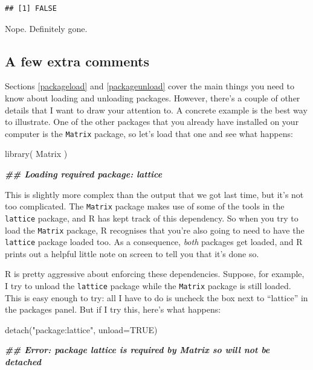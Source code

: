 \documentclass[
]{book}
\newenvironment{Shaded}{\begin{snugshade}}{\end{snugshade}}
\newcommand{\AttributeTok}[1]{\textcolor[rgb]{0.77,0.63,0.00}{#1}}
\newcommand{\ConstantTok}[1]{\textcolor[rgb]{0.00,0.00,0.00}{#1}}
\newcommand{\DocumentationTok}[1]{\textcolor[rgb]{0.56,0.35,0.01}{\textbf{\textit{#1}}}}
\newcommand{\FunctionTok}[1]{\textcolor[rgb]{0.00,0.00,0.00}{#1}}
\newcommand{\NormalTok}[1]{#1}
\newcommand{\StringTok}[1]{\textcolor[rgb]{0.31,0.60,0.02}{#1}}
\begin{document}
\begin{verbatim}
## [1] FALSE
\end{verbatim}

Nope. Definitely gone.

\hypertarget{a-few-extra-comments}{%
\subsection{A few extra comments}\label{a-few-extra-comments}}

Sections \ref{packageload} and \ref{packageunload} cover the main things you need to know about loading and unloading packages. However, there's a couple of other details that I want to draw your attention to. A concrete example is the best way to illustrate. One of the other packages that you already have installed on your computer is the \texttt{Matrix} package, so let's load that one and see what happens:

\begin{Shaded}
\begin{Highlighting}[]
\FunctionTok{library}\NormalTok{( Matrix )}

\DocumentationTok{\#\# Loading required package: lattice}
\end{Highlighting}
\end{Shaded}

This is slightly more complex than the output that we got last time, but it's not too complicated. The \texttt{Matrix} package makes use of some of the tools in the \texttt{lattice} package, and R has kept track of this dependency. So when you try to load the \texttt{Matrix} package, R recognises that you're also going to need to have the \texttt{lattice} package loaded too. As a consequence, \emph{both} packages get loaded, and R prints out a helpful little note on screen to tell you that it's done so.

R is pretty aggressive about enforcing these dependencies. Suppose, for example, I try to unload the \texttt{lattice} package while the \texttt{Matrix} package is still loaded. This is easy enough to try: all I have to do is uncheck the box next to ``lattice'' in the packages panel. But if I try this, here's what happens:

\begin{Shaded}
\begin{Highlighting}[]
\FunctionTok{detach}\NormalTok{(}\StringTok{"package:lattice"}\NormalTok{, }\AttributeTok{unload=}\ConstantTok{TRUE}\NormalTok{)}

\DocumentationTok{\#\# Error: package \textasciigrave{}lattice\textquotesingle{} is required by \textasciigrave{}Matrix\textquotesingle{} so will not be detached}
\end{Highlighting}
\end{Shaded}
\end{document}
